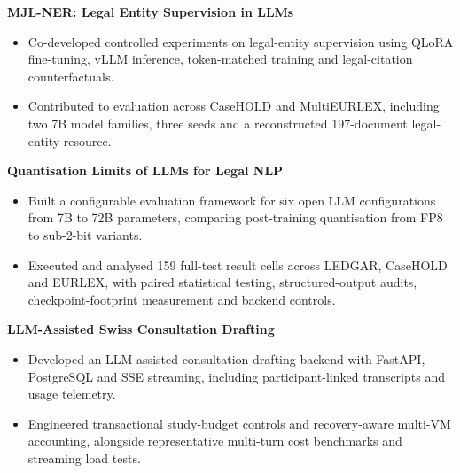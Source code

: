 \documentclass[11pt, a4paper]{article}
\begin{document}
\begin{minipage}{\linewidth}
\textbf{MJL-NER: Legal Entity Supervision in LLMs}
\begin{itemize}
  \item Co-developed controlled experiments on legal-entity supervision using QLoRA fine-tuning, vLLM inference, token-matched training and legal-citation counterfactuals.
  \item Contributed to evaluation across CaseHOLD and MultiEURLEX, including two 7B model families, three seeds and a reconstructed 197-document legal-entity resource.
\end{itemize}
\end{minipage}\par\vspace{6pt}

\begin{minipage}{\linewidth}
\textbf{Quantisation Limits of LLMs for Legal NLP}
\begin{itemize}
  \item Built a configurable evaluation framework for six open LLM configurations from 7B to 72B parameters, comparing post-training quantisation from FP8 to sub-2-bit variants.
  \item Executed and analysed 159 full-test result cells across LEDGAR, CaseHOLD and EURLEX, with paired statistical testing, structured-output audits, checkpoint-footprint measurement and backend controls.
\end{itemize}
\end{minipage}\par\vspace{6pt}

\begin{minipage}{\linewidth}
\textbf{LLM-Assisted Swiss Consultation Drafting}
\begin{itemize}
  \item Developed an LLM-assisted consultation-drafting backend with FastAPI, PostgreSQL and SSE streaming, including participant-linked transcripts and usage telemetry.
  \item Engineered transactional study-budget controls and recovery-aware multi-VM accounting, alongside representative multi-turn cost benchmarks and streaming load tests.
\end{itemize}
\end{minipage}\par\vspace{6pt}
\end{document}
